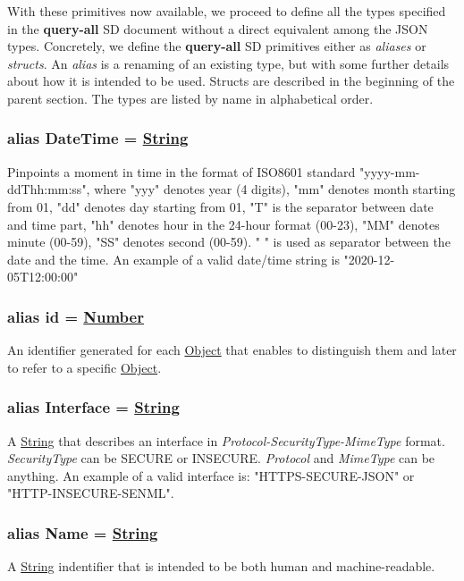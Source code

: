 \documentclass[a4paper]{arrowhead}
\newcommand{\pdef}[1]{{\textcolor{ArrowheadGrey}{#1 \label{sec:model:primitives:#1} \label{sec:model:primitives:#1s}}}}
\newcommand{\pref}[1]{{\textcolor{ArrowheadGrey}{\hyperref[sec:model:primitives:#1]{#1}}}}
\begin{document}
With these primitives now available, we proceed to define all the types specified in the \textbf{query-all} SD document without a direct equivalent among the JSON types.
Concretely, we define the \textbf{query-all} SD primitives either as \textit{aliases} or \textit{structs}.
An \textit{alias} is a renaming of an existing type, but with some further details about how it is intended to be used.
Structs are described in the beginning of the parent section.
The types are listed by name in alphabetical order.

\subsubsection{alias \pdef{DateTime} = \pref{String}}

Pinpoints a moment in time in the format of ISO8601 standard "yyyy-mm-ddThh:mm:ss", where "yyy" denotes year (4 digits), "mm" denotes month starting from 01, "dd" denotes day starting from 01, "T" is the separator between date and time part, "hh" denotes hour in the 24-hour format (00-23), "MM" denotes minute (00-59), "SS" denotes second (00-59). " " is used as separator between the date and the time.
An example of a valid date/time string is "2020-12-05T12:00:00"

\subsubsection{alias \pdef{id} = \pref{Number}}

An identifier generated for each \pref{Object} that enables to distinguish them and later to refer to a specific \pref{Object}.

\subsubsection{alias \pdef{Interface} = \pref{String}}

A \pref{String} that describes an interface in \textit{Protocol-SecurityType-MimeType} format. \textit{SecurityType} can be SECURE or INSECURE. \textit{Protocol} and \textit{MimeType} can be anything. An example of a valid interface is: "HTTPS-SECURE-JSON" or "HTTP-INSECURE-SENML".

\subsubsection{alias \pdef{Name} = \pref{String}}

A \pref{String} indentifier that is intended to be both human and machine-readable.
\end{document}
